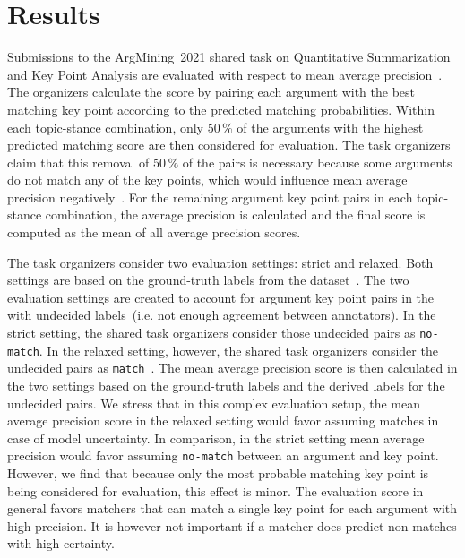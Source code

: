 \section{Results}\label{results}


Submissions to the ArgMining~2021 shared task on Quantitative Summarization and Key Point Analysis are evaluated with 
respect to mean average precision~\cite{kpa-2021-overview}. 
The organizers calculate the score by pairing each argument with the best matching key point according to the predicted 
matching probabilities. 
Within each topic-stance combination, only 50\,\% of the arguments with the highest predicted matching score are then 
considered for evaluation. 
The task organizers claim that this removal of 50\,\% of the pairs is necessary because some arguments do not match any 
of the key points, which would influence mean average precision negatively~\cite{kpa-2021-overview}. 
For the remaining argument key point pairs in each topic-stance combination, the average precision is calculated and the 
final score is computed as the mean of all average precision scores.

The task organizers consider two evaluation settings: strict and relaxed.
Both settings are based on the ground-truth labels from the \ArgKP dataset~\cite{Bar-HaimEFKLS2020}. The two evaluation settings are created to account for argument key point pairs in the \ArgKP with undecided labels~(i.e. not enough agreement between annotators). In the strict setting,
the shared task organizers consider those undecided pairs as \texttt{no-match}. In the relaxed setting, however, the shared task organizers consider the undecided pairs as \texttt{match}~\cite{kpa-2021-overview}. %
The mean average precision score is then calculated in the two settings based on the ground-truth labels and the derived labels for the undecided pairs. 
We stress that in this complex evaluation setup, the mean average precision score in the relaxed setting would 
favor assuming matches in case of model uncertainty. 
In comparison, in the strict setting mean average precision would favor assuming \texttt{no-match} between an argument and key point.
However, we find that because only the most probable matching key point is being considered for evaluation, this effect is minor.
The evaluation score in general favors matchers that can match a single key point for each argument with high precision.
It is however not important if a matcher does predict non-matches with high certainty.

